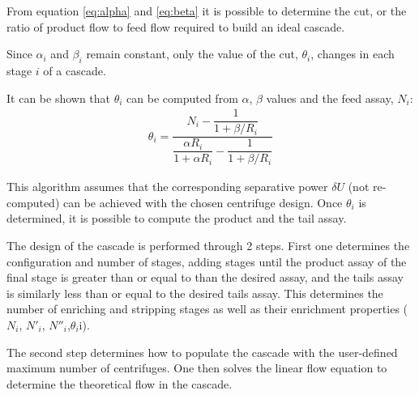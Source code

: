 From equation \eqref{eq:alpha} and \eqref{eq:beta} it is possible to determine
the cut, or the ratio of product flow to feed flow
required to build an ideal cascade.

Since $\alpha_{i}$ and $\beta_{i}$ remain constant, only the value of the cut,
$\theta_{i}$, changes in each stage $i$ of a cascade.

It can be shown that $\theta_{i}$ can be computed from $\alpha$,
$\beta$ values and the feed assay, $N_{i}$:
\begin{eqnarray}
    \theta_{i} = \dfrac{N_{i} - \dfrac{1}{1 + \beta/R_{i}}}{ \dfrac{\alpha R_{i}}{1 + \alpha R_{i}} -
           \dfrac{1}{1 + \beta/R_{i}}}
\end{eqnarray}

This algorithm assumes that the corresponding separative power $\delta U$ (not
re-computed) can be achieved with the chosen centrifuge design. Once
$\theta_{i}$ is determined, it is possible to compute the product and the tail
assay.

The design of the cascade is performed through 2 steps. First one determines the
configuration and number of stages, adding stages until the product assay of the final stage is greater than or equal to than the desired assay, and the tails assay is similarly less than or equal to the desired tails assay. This determines the number of enriching and stripping stages as
well as their enrichment properties ($N_{i}$, $N'_{i}$,
$N''_{i}$,$\theta_{i}$i).


The second step determines how to populate the cascade with the user-defined
maximum number of centrifuges. One then solves the linear flow equation to
determine the theoretical flow in the cascade.

